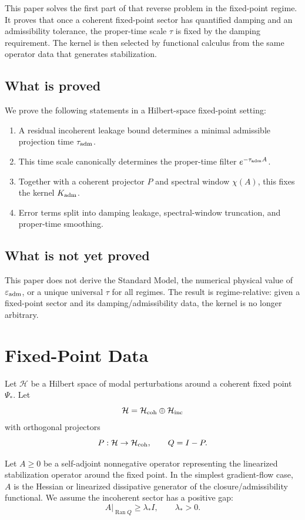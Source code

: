 \documentclass[11pt]{article}
\begin{document}
This paper solves the first part of that reverse problem in the fixed-point regime. It proves that once a coherent fixed-point sector has quantified damping and an admissibility tolerance, the proper-time scale \(\tau\) is fixed by the damping requirement. The kernel is then selected by functional calculus from the same operator data that generates stabilization.

\subsection*{What is proved}

We prove the following statements in a Hilbert-space fixed-point setting:

\begin{enumerate}
\item A residual incoherent leakage bound determines a minimal admissible projection time \(\tau_{\rm adm}\).
\item This time scale canonically determines the proper-time filter \(e^{-\tau_{\rm adm}A}\).
\item Together with a coherent projector \(P\) and spectral window \(\chi(A)\), this fixes the kernel \(K_{\rm adm}\).
\item Error terms split into damping leakage, spectral-window truncation, and proper-time smoothing.
\end{enumerate}

\subsection*{What is not yet proved}

This paper does not derive the Standard Model, the numerical physical value of \(\varepsilon_{\rm adm}\), or a unique universal \(\tau\) for all regimes. The result is regime-relative: given a fixed-point sector and its damping/admissibility data, the kernel is no longer arbitrary.

\section{Fixed-Point Data}

Let \(\mathcal H\) be a Hilbert space of modal perturbations around a coherent fixed point \(\Psi_\ast\). Let
\[
\mathcal H=\mathcal H_{\rm coh}\oplus \mathcal H_{\rm inc}
\]
with orthogonal projectors
\[
P:\mathcal H\to\mathcal H_{\rm coh},
\qquad
Q=I-P.
\]

Let \(A\ge0\) be a self-adjoint nonnegative operator representing the linearized stabilization operator around the fixed point. In the simplest gradient-flow case, \(A\) is the Hessian or linearized dissipative generator of the closure/admissibility functional. We assume the incoherent sector has a positive gap:
\[
A|_{\operatorname{Ran}Q}\ge \lambda_\ast I,
\qquad \lambda_\ast>0.
\]
\end{document}

